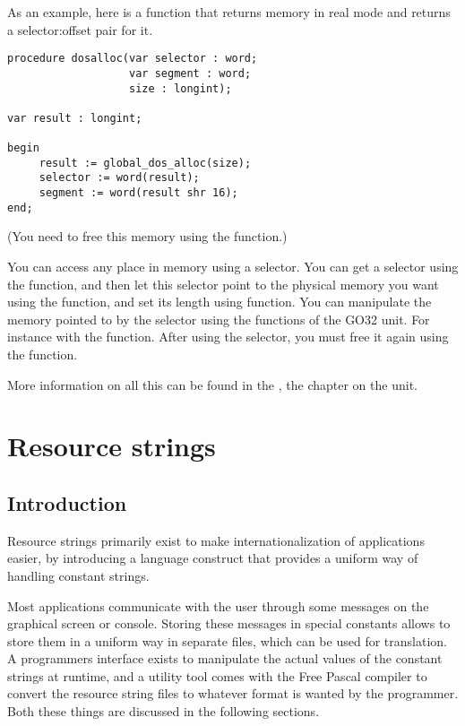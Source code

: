 {As an example, here is a function that returns memory in real mode \dos and
returns a selector:offset pair for it.
\begin{verbatim}
procedure dosalloc(var selector : word;
                   var segment : word;
                   size : longint);

var result : longint;

begin
     result := global_dos_alloc(size);
     selector := word(result);
     segment := word(result shr 16);
end;
\end{verbatim}
(You need to free this memory using the  function.)

You can access any place in memory using a selector. You can get a selector
using the  function, and then let this selector
point to the physical memory you want using the
 function, and set its length using
 function.
You can manipulate the memory pointed to by the selector using the functions
of the GO32 unit. For instance with the  function.
After using the selector, you must free it again using the
 function.

More information on all this can be found in the \unitsref, the chapter on
the  unit.



\chapter{Resource strings}
\label{resourcestrings}
\section{Introduction}
Resource strings primarily exist to make internationalization of
applications easier, by introducing a language construct that provides
a uniform way of handling constant strings.

Most applications communicate with the user through some messages on the
graphical screen or console. Storing these messages in special constants
allows to store them in a uniform way in separate files, which can be used
for translation. A programmers interface exists to manipulate the actual
values of the constant strings at runtime, and a utility tool comes with the
Free Pascal compiler to convert the resource string files to whatever format
is wanted by the programmer. Both these things are discussed in the
following sections.

}
